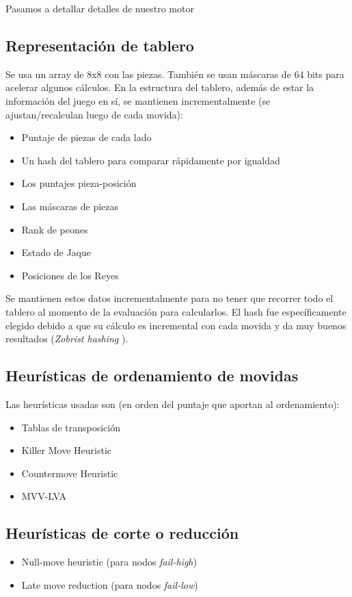 \documentclass{article}
\begin{document}
Pasamos a detallar detalles de nuestro motor
\\

\subsection{Representación de tablero}
Se usa un array de 8x8 con las piezas. También se usan máscaras
de 64 bits para acelerar algunos cálculos. En la estructura del
tablero, además de estar la información del juego en sí, se mantienen
incrementalmente (se ajustan/recalculan luego de cada movida):

\begin{itemize}
\item Puntaje de piezas de cada lado
\item Un hash del tablero para comparar rápidamente por igualdad
\item Los puntajes pieza-posición
\item Las máscaras de piezas
\item Rank de peones
\item Estado de Jaque
\item Posiciones de los Reyes
\end{itemize}

Se mantienen estos datos incrementalmente para no tener que recorrer
todo el tablero al momento de la evaluación para calcularlos. El hash
fue específicamente elegido debido a que su cálculo es incremental
con cada movida y da muy buenos resultados (\emph{Zobrist hashing}
\cite{zobrist}).

\subsection{Heurísticas de ordenamiento de movidas}

Las heurísticas usadas son (en orden del puntaje que aportan al
ordenamiento):
\begin{itemize}
\item Tablas de transposición
\item Killer Move Heuristic
\item Countermove Heuristic
\item MVV-LVA
\end{itemize}

\subsection{Heurísticas de corte o reducción}
\begin{itemize}
\item Null-move heuristic (para nodos \emph{fail-high})
\item Late move reduction (para nodos \emph{fail-low})
\end{itemize}
\end{document}
